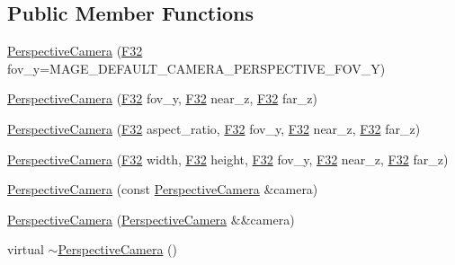 \subsection*{Public Member Functions}
\begin{DoxyCompactItemize}
\item 
\hyperlink{classmage_1_1_perspective_camera_afa6acb116037cf4255355a791b260f04}{Perspective\+Camera} (\hyperlink{namespacemage_aa97e833b45f06d60a0a9c4fc22ae02c0}{F32} fov\+\_\+y=M\+A\+G\+E\+\_\+\+D\+E\+F\+A\+U\+L\+T\+\_\+\+C\+A\+M\+E\+R\+A\+\_\+\+P\+E\+R\+S\+P\+E\+C\+T\+I\+V\+E\+\_\+\+F\+O\+V\+\_\+Y)
\item 
\hyperlink{classmage_1_1_perspective_camera_aefeddb5c1199f9048793db889a647028}{Perspective\+Camera} (\hyperlink{namespacemage_aa97e833b45f06d60a0a9c4fc22ae02c0}{F32} fov\+\_\+y, \hyperlink{namespacemage_aa97e833b45f06d60a0a9c4fc22ae02c0}{F32} near\+\_\+z, \hyperlink{namespacemage_aa97e833b45f06d60a0a9c4fc22ae02c0}{F32} far\+\_\+z)
\item 
\hyperlink{classmage_1_1_perspective_camera_a56979aa4bec4c2f2c09fd4452710a3c8}{Perspective\+Camera} (\hyperlink{namespacemage_aa97e833b45f06d60a0a9c4fc22ae02c0}{F32} aspect\+\_\+ratio, \hyperlink{namespacemage_aa97e833b45f06d60a0a9c4fc22ae02c0}{F32} fov\+\_\+y, \hyperlink{namespacemage_aa97e833b45f06d60a0a9c4fc22ae02c0}{F32} near\+\_\+z, \hyperlink{namespacemage_aa97e833b45f06d60a0a9c4fc22ae02c0}{F32} far\+\_\+z)
\item 
\hyperlink{classmage_1_1_perspective_camera_a8b6b2d8aaca4f2f56cc03e2055098e85}{Perspective\+Camera} (\hyperlink{namespacemage_aa97e833b45f06d60a0a9c4fc22ae02c0}{F32} width, \hyperlink{namespacemage_aa97e833b45f06d60a0a9c4fc22ae02c0}{F32} height, \hyperlink{namespacemage_aa97e833b45f06d60a0a9c4fc22ae02c0}{F32} fov\+\_\+y, \hyperlink{namespacemage_aa97e833b45f06d60a0a9c4fc22ae02c0}{F32} near\+\_\+z, \hyperlink{namespacemage_aa97e833b45f06d60a0a9c4fc22ae02c0}{F32} far\+\_\+z)
\item 
\hyperlink{classmage_1_1_perspective_camera_a198d1460d9312af27ed6ef2ac28b616d}{Perspective\+Camera} (const \hyperlink{classmage_1_1_perspective_camera}{Perspective\+Camera} \&camera)
\item 
\hyperlink{classmage_1_1_perspective_camera_a04531e5b956e72300337571e0eb7143d}{Perspective\+Camera} (\hyperlink{classmage_1_1_perspective_camera}{Perspective\+Camera} \&\&camera)
\item 
virtual \hyperlink{classmage_1_1_perspective_camera_a47ba88d7458528795dd832474cdb3eb9}{$\sim$\+Perspective\+Camera} ()

\end{DoxyCompactItemize}

